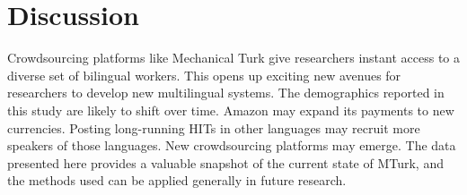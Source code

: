 \documentclass[11pt]{article}
\begin{document}
%
%
%

\section{Discussion}
Crowdsourcing platforms like Mechanical Turk give researchers instant access to a diverse set of bilingual workers.  This opens up exciting new avenues for researchers to develop new multilingual systems.   The demographics reported in this study are likely to shift over time. Amazon may expand its payments to new currencies.  Posting long-running HITs in other languages may recruit more speakers of those languages.  New crowdsourcing platforms may emerge. The data presented here provides a valuable snapshot of the current state of MTurk, and the methods used can be applied generally in future research. 
\end{document}
